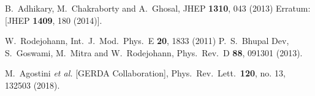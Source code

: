 \documentclass[11pt]{article}
\providecommand{\xlink}[1]
  {\href{http://arxiv.org/abs/#1}{arXiv:#1}}
\begin{document}
\begin{thebibliography}{9}
  
  
  
  
  B.~Adhikary, M.~Chakraborty and A.~Ghosal,
  JHEP {\bf 1310}, 043 (2013)
  Erratum: [JHEP {\bf 1409}, 180 (2014)].
  

  W.~Rodejohann,
  Int.\ J.\ Mod.\ Phys.\ E {\bf 20}, 1833 (2011)
  P.~S.~Bhupal Dev, S.~Goswami, M.~Mitra and W.~Rodejohann,
  Phys.\ Rev.\ D {\bf 88}, 091301 (2013).
  
  
    

   
  M.~Agostini {\it et al.} [GERDA Collaboration],
  Phys.\ Rev.\ Lett.\  {\bf 120}, no. 13, 132503 (2018).
  

\end{thebibliography}
\end{document}
